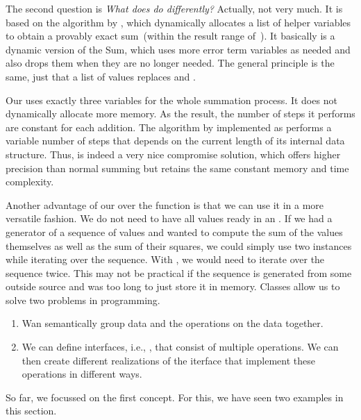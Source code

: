 The second question is \emph{What does  do differently?}
Actually, not very much.
It is based on the algorithm by \citeauthor{S1997APFPAAFRGP}, which dynamically allocates a list of helper variables to obtain a provably exact sum~(within the result range of~).
It basically is a dynamic version of the \citeauthor{K1965PFRORTE} Sum, which uses more error term variables as needed and also drops them when they are no longer needed.
The general principle is the same, just that a list of values replaces  and .

Our  uses exactly three variables for the whole summation process.
It does not dynamically allocate more memory.
As the result, the number of steps it performs are constant for each addition.
The algorithm by \citeauthor{S1997APFPAAFRGP} implemented as  performs a variable number of steps that depends on the current length of its internal data structure.
Thus,  is indeed a very nice compromise solution, which offers higher precision than normal summing but retains the same constant memory and time complexity.

Another advantage of our  over the function  is that we can use it in a more versatile fashion.
We do not need to have all values ready in an .
If we had a generator of a sequence of values and wanted to compute the sum of the values themselves as well as the sum of their squares, we could simply use two instances  while iterating over the sequence.
With , we would need to iterate over the sequence twice.
This may not be practical if the sequence is generated from some outside source and was too long to just store it in memory.%
%
\endhsection%
%
%
Classes allow us to solve two problems in programming.%
%
\begin{enumerate}%
\item Wan semantically group data and the operations on the data together.%
\item We can define interfaces, i.e., , that consist of multiple operations. %
We can then create different realizations of the iterface that implement these operations in different ways.%
\end{enumerate}%
%
So far, we focussed on the first concept.
For this, we have seen two examples in this section.

